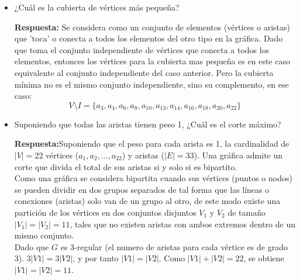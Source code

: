 \begin{itemize}
    \vspace{1cm}

    \item ¿Cuál es la cubierta de vértices más pequeña?
    
    \textbf{Respuesta:} Se considera como un conjunto de elementos (vértices o aristas) que 'toca' o conecta a todos los elementos del otro tipo en la gráfica. Dado que toma el conjunto independiente de vértices que conecta a todos los elementos, entonces los vértices para la cubierta mas pequeña es en este caso equivalente al conjunto independiente del caso anterior. Pero la cubierta mínima no es el mismo conjunto independiente, sino su complemento, en ese caso:
    \[
    V \setminus I = \{a_3, a_4, a_6, a_8, a_{10}, a_{13}, a_{14}, a_{16}, a_{18}, a_{20}, a_{22}\}
    \] \cite{jungnickel2005graphs}
    \vspace{1cm}


    \item Suponiendo que todas las aristas tienen peso 1, ¿Cuál es el corte máximo?
    
    \textbf{Respuesta:}Suponiendo que el peso para cada arista es 1, la cardinalidad de $|V|= $22 vértices ($a_1, a_2, \dots, a_{22}$) y aristas ($\vert{}E\vert{} = 33$). Una gráfica admite un corte que divida el total de sus aristas si y solo si es bipartito. \cite{bondy2008graph} \\

    Como una gráfica se considera bipartita cuando sus vértices (puntos o nodos) se pueden dividir en dos grupos separados de tal forma que las líneas o conexiones (aristas) solo van de un grupo al otro, de este modo existe una partición de los vértices en dos conjuntos disjuntos $V_1$ y $V_2$ de tamaño $\vert{}V_1\vert{} = \vert{}V_2\vert{} = 11$, tales que no existen aristas con ambos extremos dentro de un mismo conjunto.\\

    Dado que $G$ es 3-regular (el numero de aristas para cada vértice es de grado 3). $3|V1|=3|V2|$, y por tanto $|V1|=|V2|$. Como $|V1|+|V2|=22$, se obtiene $|V1|=|V2|=11$. \cite{bondy2008graph} \\



\end{itemize}
